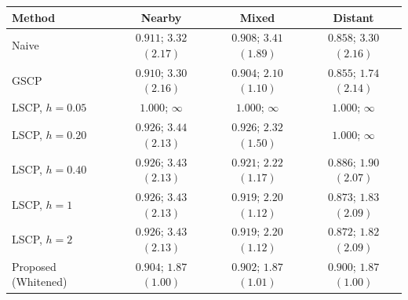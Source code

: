 \begin{tabular}{lccc}
\toprule
Method & Nearby & Mixed & Distant\\
\midrule
Naive
& $0.911$; $3.32$ $(2.17)$
& $0.908$; $3.41$ $(1.89)$
& $0.858$; $3.30$ $(2.16)$\\
GSCP
& $0.910$; $3.30$ $(2.16)$
& $0.904$; $2.10$ $(1.10)$
& $0.855$; $1.74$ $(2.14)$\\
LSCP, $h=0.05$
& $1.000$; $\infty$
& $1.000$; $\infty$
& $1.000$; $\infty$\\
LSCP, $h=0.20$
& $0.926$; $3.44$ $(2.13)$
& $0.926$; $2.32$ $(1.50)$
& $1.000$; $\infty$\\
LSCP, $h=0.40$
& $0.926$; $3.43$ $(2.13)$
& $0.921$; $2.22$ $(1.17)$
& $0.886$; $1.90$ $(2.07)$\\
LSCP, $h=1$
& $0.926$; $3.43$ $(2.13)$
& $0.919$; $2.20$ $(1.12)$
& $0.873$; $1.83$ $(2.09)$\\
LSCP, $h=2$
& $0.926$; $3.43$ $(2.13)$
& $0.919$; $2.20$ $(1.12)$
& $0.872$; $1.82$ $(2.09)$\\
\midrule
Proposed (Whitened)
& $0.904$; $1.87$ $(1.00)$
& $0.902$; $1.87$ $(1.01)$
& $0.900$; $1.87$ $(1.00)$\\
\bottomrule
\end{tabular}
